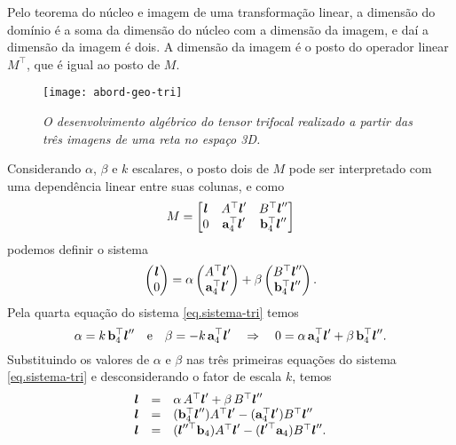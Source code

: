 Pelo teorema do núcleo e imagem de uma transformação linear, a dimensão do domínio é a soma da dimensão do núcleo com a dimensão da imagem, e daí a dimensão da imagem é dois. A dimensão da imagem é o posto do operador linear $M^\top$, que é igual ao posto de $M$. 
\begin{figure}[!htb]
\centering
\texttt{[image: abord-geo-tri]}
\caption{{\it O desenvolvimento algébrico do tensor trifocal realizado a partir das três imagens de uma reta no espaço 3D.}}
\label{fig.abord-geo-tri}
\end{figure}
Considerando $\alpha$, $\beta$ e $k$ escalares, o posto dois de $M$ pode ser interpretado com uma dependência linear entre suas colunas, e como
\begin{equation*}
M=
\begin{bmatrix}
\boldsymbol{l}&A^\top\boldsymbol{l}'&B^\top\boldsymbol{l}''\\
0&{\bf a}^\top_4\boldsymbol{l}'&
{\bf b}^\top_4\boldsymbol{l}''
\end{bmatrix}
\end{equation*}
podemos definir o sistema
\begin{equation}\label{eq.sistema-tri}
\begin{pmatrix}
\boldsymbol{l}\\
0
\end{pmatrix}
=
\alpha
\begin{pmatrix}
A^\top\boldsymbol{l}'\\
{\bf a}^\top_4\boldsymbol{l}'
\end{pmatrix}
+\beta
\begin{pmatrix}
B^\top\boldsymbol{l}''\\
{\bf b}^\top_4\boldsymbol{l}''
\end{pmatrix}.
\end{equation}
Pela quarta equação do sistema \ref{eq.sistema-tri} temos
\begin{equation*}
\alpha=k\,{\bf b}^\top_4\boldsymbol{l}''\quad\text{e}\quad\beta=-k\,{\bf a}^\top_4\boldsymbol{l}'\quad\Rightarrow\quad0=\alpha\,{\bf a}^\top_4\boldsymbol{l}'+\beta\,{\bf b}^\top_4\boldsymbol{l}''.
\end{equation*}
Substituindo os valores de $\alpha$ e $\beta$ nas três primeiras equações do sistema \ref{eq.sistema-tri} e desconsiderando o fator de escala $k$, temos
\begin{equation*}
\begin{array}{rcl}
\boldsymbol{l}&=&\alpha\,A^\top\boldsymbol{l}'+\beta\,B^\top\boldsymbol{l}''\\
\boldsymbol{l}&=&({\bf b}^\top_4\boldsymbol{l}'')A^\top\boldsymbol{l}'-({\bf a}^\top_4\boldsymbol{l}')B^\top\boldsymbol{l}''\\
\boldsymbol{l}&=&(\boldsymbol{l}''^\top{\bf b}_4)A^\top\boldsymbol{l}'-(\boldsymbol{l}'^\top{\bf a}_4)B^\top\boldsymbol{l}''.
\end{array}
\end{equation*}
